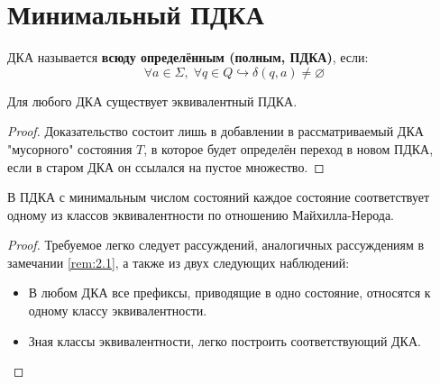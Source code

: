 \documentclass[11pt]{article}
\begin{document}
\section{Минимальный ПДКА}

\begin{definition}
    ДКА называется \textbf{всюду определённым (полным, ПДКА)}, если:
    \[\forall a \in \Sigma, \; \forall q \in Q \hookrightarrow \delta(q, a) \neq \varnothing\]
\end{definition}

\begin{lemma}
    Для любого ДКА существует эквивалентный ПДКА.
\end{lemma}

\begin{proof}
    Доказательство состоит лишь в добавлении в рассматриваемый ДКА "мусорного" \; состояния $T$, в которое будет определён переход в новом ПДКА, если в старом ДКА он ссылался на пустое множество.
\end{proof}

\begin{lemma}
    В ПДКА с минимальным числом состояний каждое состояние соответствует одному из классов эквивалентности по отношению Майхилла-Нерода.
\end{lemma}

\begin{proof}
    Требуемое легко следует рассуждений, аналогичных рассуждениям в замечании \ref{rem:2.1}, а также из двух следующих наблюдений:
    \begin{itemize}
        \item В любом ДКА все префиксы, приводящие в одно состояние, относятся к одному классу эквивалентности.
        \item Зная классы эквивалентности, легко построить соответствующий ДКА.
    \end{itemize}
\end{proof}
\end{document}
